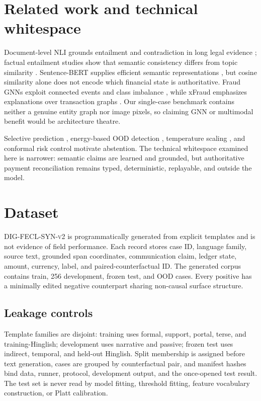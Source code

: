 \documentclass[10pt,twocolumn]{article}
\newcommand{\dataset}{\textsc{DIG-FECL-SYN-v2}}
\begin{document}
\section{Related work and technical whitespace}
Document-level NLI grounds entailment and contradiction in long legal evidence \cite{koreeda2021contractnli}; factual entailment studies show that semantic consistency differs from topic similarity \cite{morlan2024factual}. Sentence-BERT supplies efficient semantic representations \cite{reimers2019sbert}, but cosine similarity alone does not encode which financial state is authoritative. Fraud GNNs exploit connected events and class imbalance \cite{dou2020caregnn,liu2021pcgnn}, while xFraud emphasizes explanations over transaction graphs \cite{rao2022xfraud}. Our single-case benchmark contains neither a genuine entity graph nor image pixels, so claiming GNN or multimodal benefit would be architecture theatre.

Selective prediction \cite{geifman2019selectivenet}, energy-based OOD detection \cite{liu2020energy}, temperature scaling \cite{guo2017calibration}, and conformal risk control \cite{angelopoulos2024crc} motivate abstention. The technical whitespace examined here is narrower: semantic claims are learned and grounded, but authoritative payment reconciliation remains typed, deterministic, replayable, and outside the model.

\section{Dataset}
\dataset{} is programmatically generated from explicit templates and is not evidence of field performance. Each record stores case ID, language family, source text, grounded span coordinates, communication claim, ledger state, amount, currency, label, and paired-counterfactual ID. The generated corpus contains \TrainCases{} train, 256 development, \TestCases{} frozen test, and \OODCases{} OOD cases. Every positive has a minimally edited negative counterpart sharing non-causal surface structure.

\subsection{Leakage controls}
Template families are disjoint: training uses formal, support, portal, terse, and training-Hinglish; development uses narrative and passive; frozen test uses indirect, temporal, and held-out Hinglish. Split membership is assigned before text generation, cases are grouped by counterfactual pair, and manifest hashes bind data, runner, protocol, development output, and the once-opened test result. The test set is never read by model fitting, threshold fitting, feature vocabulary construction, or Platt calibration.
\end{document}
